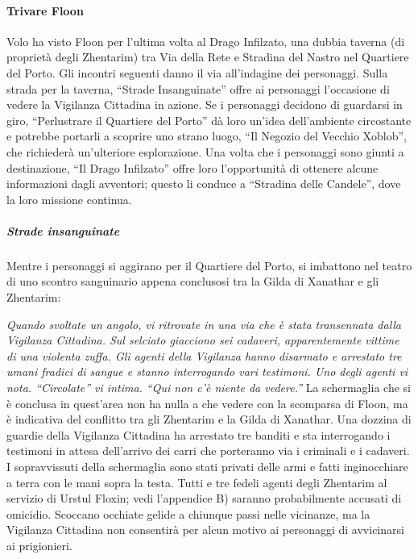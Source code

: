 \documentclass{article}
\begin{document}
\paragraph{Trivare Floon}Volo ha visto Floon per l'ultima volta al Drago Infilzato, una dubbia taverna (di proprietà degli Zhentarim) tra Via della Rete e Stradina del Nastro nel Quartiere del Porto. Gli incontri seguenti danno il via all'indagine dei personaggi. 
Sulla strada per la taverna, “Strade Insanguinate” offre ai personaggi l'occasione di vedere la Vigilanza Cittadina in azione. Se i personaggi decidono di guardarsi in giro, “Perlustrare il Quartiere del Porto” dà loro un'idea dell'ambiente circostante e potrebbe portarli a scoprire uno strano luogo, “Il Negozio del Vecchio Xoblob”, che richiederà un'ulteriore esplorazione. Una volta che i personaggi sono giunti a destinazione, “Il Drago Infilzato” offre loro l'opportunità di ottenere alcune informazioni dagli avventori; questo li conduce a “Stradina delle Candele”, dove la loro missione continua.
\subparagraph{Strade insanguinate}
 Mentre i personaggi si aggirano per il Quartiere del Porto, si imbattono nel teatro di uno scontro sanguinario appena conclusosi tra la Gilda di Xanathar e gli Zhentarim: \newline

\textit{Quando svoltate un angolo, vi ritrovate in una via che è stata transennata dalla Vigilanza Cittadina. Sul selciato giacciono sei cadaveri, apparentemente vittime di una violenta zuffa. Gli agenti della Vigilanza hanno disarmato e arrestato tre umani fradici di sangue e stanno interrogando vari testimoni. Uno degli agenti vi nota. 
“Circolate” vi intima. “Qui non c'è niente da vedere.”}
\newline
    La schermaglia che si è conclusa in quest'area non ha nulla a che vedere con la scomparsa di Floon, ma è indicativa del conflitto tra gli Zhentarim e la Gilda di Xanathar. 
Una dozzina di guardie della Vigilanza Cittadina ha arrestato tre banditi e sta interrogando i testimoni in attesa dell’arrivo dei carri che porteranno via i criminali e i cadaveri. I sopravvissuti della schermaglia sono stati privati delle armi e fatti inginocchiare a terra con le mani sopra la testa. Tutti e tre fedeli agenti degli Zhentarim al servizio di Urstul Floxin; vedi l’appendice B) saranno probabilmente accusati di omicidio. Scoccano occhiate gelide a chiunque passi nelle vicinanze, ma la Vigilanza Cittadina non consentirà per alcun motivo ai personaggi di avvicinarsi ai prigionieri.
\end{document}
